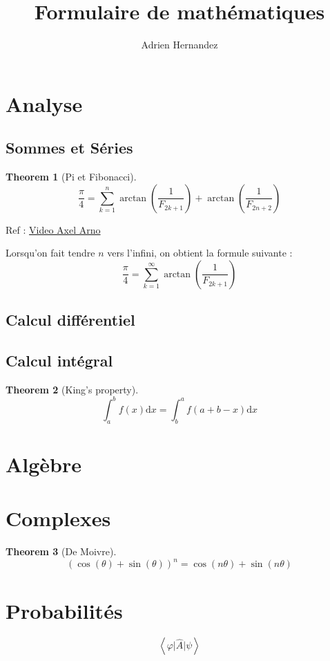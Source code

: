 \documentclass{article}
\title{Formulaire de mathématiques}
\author{Adrien Hernandez}
\date{}
\newtheorem{theorem}{Theorem}
\begin{document}
\maketitle
\section{Analyse}
\subsection{Sommes et Séries}
\begin{theorem}[Pi et Fibonacci]
    $$ \frac{\pi}{4} = \sum_{k=1}^{n} \arctan\left(\frac{1}{F_{2k+1}}\right) + \arctan\left(\frac{1}{F_{2n+2}}\right)$$
\end{theorem}
Ref : \href{https://www.youtube.com/watch?v=nZRKNth6OSA}{Video Axel Arno}

Lorsqu'on fait tendre $n$ vers l'infini, on obtient la formule suivante : 
$$ \frac{\pi}{4} = \sum_{k=1}^{\infty} \arctan\left(\frac{1}{F_{2k+1}}\right) $$
\subsection{Calcul différentiel}

\subsection{Calcul intégral}
\begin{theorem}[King's property]

    $$ \int_a^b f(x) \mathrm{d}x = \int_b^a f(a+b-x) \mathrm{d}x $$
    
\end{theorem}

\section{Algèbre}

\section{Complexes}
\begin{theorem}[De Moivre]
    $$(\cos(\theta) + \sin(\theta))^n =  \cos(n\theta) + \sin(n\theta)$$
\end{theorem}

\section{Probabilités}

$$ \left\langle \varphi  \vert  \hat{A} \vert  \psi\right\rangle  $$
\end{document}
